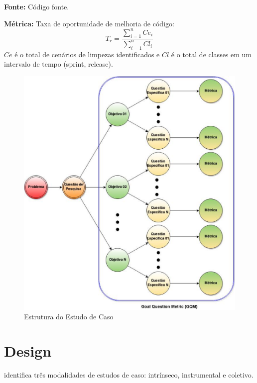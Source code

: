 \textbf{Fonte:} Código fonte.

\textbf{Métrica:} Taxa de oportunidade de melhoria de código: $$ T_r =   \frac{{\sum_{i=1}^{n}{Ce_i}}}{\sum_{i=1}^{n}{Cl_i}} $$ $ Ce $ é o total de cenários de limpezas identificados e $ Cl $  é o total de classes em um intervalo de tempo (sprint, release).
	
\begin{figure}[h!]
\centering
\includegraphics[keepaspectratio=false,scale=0.5]{figuras/figuras_nilton/EstruturaEstudoCaso.eps}
\caption{Estrutura do Estudo de Caso}
\label{EstruturaEstudoCaso}
\end{figure}


\section{Design}
\label{sec:design} 

\cite{stake_art_1995} identifica três modalidades de estudos de caso: intrínseco, instrumental e coletivo. 

